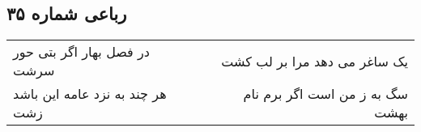 \begin{center}
\section*{رباعی شماره ۳۵}
\label{sec:sh035}
\begin{longtable}{l p{0.5cm} r}
در فصل بهار اگر بتی حور سرشت
&&
یک ساغر می دهد مرا بر لب کشت
\\
هر چند به نزد عامه این باشد زشت
&&
سگ به ز من است اگر برم نام بهشت
\\
\end{longtable}
\end{center}
